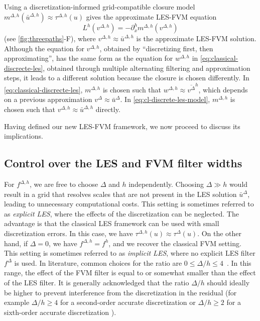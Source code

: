 \documentclass[preprint,twocolumn,5p]{elsarticle}
\begin{document}
Using a discretization-informed grid-compatible closure model
$m^{\Delta, h}(\bar{u}^{\Delta, h}) \approx \tau^{\Delta, h}(u)$ gives
the approximate LES-FVM equation
\begin{equation} \label{eq:cl-discrete-les-model}
    L^h\left(v^{\Delta, h}\right) =
    - \partial^h_x m^{\Delta, h}\left(v^{\Delta, h}\right)
\end{equation}
(see \cref{fig:threepaths}-F),
where $v^{\Delta, h} \approx \bar{u}^{\Delta, h}$
is the approximate LES-FVM solution.
Although the equation for $v^{\Delta, h}$, obtained by
``discretizing first, then approximating'',
has the same form as the equation for $w^{\Delta, h}$ in
\eqref{eq:classical-discrecte-les},
obtained through multiple alternating filtering and approximation steps,
it leads to a different solution because the closure is chosen differently.
In \cref{eq:classical-discrecte-les},
$m^{\Delta, h}$ is chosen such that
$w^{\Delta, h} \approx \overline{v^\Delta}^h$,
which depends on a previous approximation
$v^\Delta \approx \bar{u}^\Delta$.
In \cref{eq:cl-discrete-les-model}, $m^{\Delta, h}$ is chosen such that 
$v^{\Delta, h} \approx \bar{u}^{\Delta, h}$ directly.

Having defined our new LES-FVM framework,
we now proceed to discuss its implications.



\subsection{Control over the LES and FVM filter widths}
\label{sec:filter-widths}


For $f^{\Delta, h}$, we are free to choose $\Delta$ and $h$ independently.
Choosing $\Delta \gg h$ would result in a grid that resolves scales
that are not present in the LES solution $\bar{u}^{\Delta}$, leading to
unnecessary computational costs.
This setting is sometimes referred to as
\emph{explicit LES}, where the effects of the discretization can be neglected.
The advantage is that the classical LES framework can be used with small
discretization errors.
In this case, we have $\tau^{\Delta, h}(u) \approx \tau^\Delta(u)$.
On the other hand, if $\Delta = 0$, we have $f^{\Delta, h} = f^h$, and we
recover the classical FVM setting.
This setting is sometimes referred to as \emph{implicit LES},
where no explicit LES filter $f^\Delta$ is used.
In literature, common choices for the ratio are $0 \leq \Delta / h \leq
4$~\cite{ghosalAnalysisNumericalErrors1996,
geurtsNumericallyInducedHighpass2005}.
In this range, the effect of the FVM filter is equal to or somewhat
smaller than the effect of the LES filter.
It is generally acknowledged that the ratio $\Delta / h$ should ideally be
higher to prevent interference from the discretization in the residual
(for example $\Delta / h \geq 4$ for a second-order accurate discretization
\cite{chowFurtherStudyNumerical2003} or
$\Delta / h \geq 2$ for a sixth-order accurate discretization \cite{vremanLargeeddySimulationTurbulent1997}).
\end{document}
